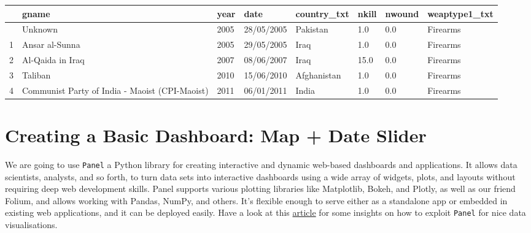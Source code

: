 \documentclass[
  letterpaper,
  DIV=11,
  numbers=noendperiod]{scrreprt}
\begin{document}
\begin{longtable}[]{@{}llllllll@{}}
\toprule\noalign{}
& gname & year & date & country\_txt & nkill & nwound &
weaptype1\_txt \\
\midrule\noalign{}
\endhead
\bottomrule\noalign{}
\endlastfoot
0 & Unknown & 2005 & 28/05/2005 & Pakistan & 1.0 & 0.0 & Firearms \\
1 & Ansar al-Sunna & 2005 & 29/05/2005 & Iraq & 1.0 & 0.0 & Firearms \\
2 & Al-Qaida in Iraq & 2007 & 08/06/2007 & Iraq & 15.0 & 0.0 &
Firearms \\
3 & Taliban & 2010 & 15/06/2010 & Afghanistan & 1.0 & 0.0 & Firearms \\
4 & Communist Party of India - Maoist (CPI-Maoist) & 2011 & 06/01/2011 &
India & 1.0 & 0.0 & Firearms \\
\end{longtable}

\section{Creating a Basic Dashboard: Map + Date
Slider}\label{creating-a-basic-dashboard-map-date-slider}

We are going to use \texttt{Panel} a Python library for creating
interactive and dynamic web-based dashboards and applications. It allows
data scientists, analysts, and so forth, to turn data sets into
interactive dashboards using a wide array of widgets, plots, and layouts
without requiring deep web development skills. Panel supports various
plotting libraries like Matplotlib, Bokeh, and Plotly, as well as our
friend Folium, and allows working with Pandas, NumPy, and others. It's
flexible enough to serve either as a standalone app or embedded in
existing web applications, and it can be deployed easily. Have a look at
this
\href{https://medium.com/@marcskovmadsen/i-prefer-to-use-panel-for-my-data-apps-here-is-why-1ff5d2b98e8f}{article}
for some insights on how to exploit \texttt{Panel} for nice data
visualisations.
\end{document}
